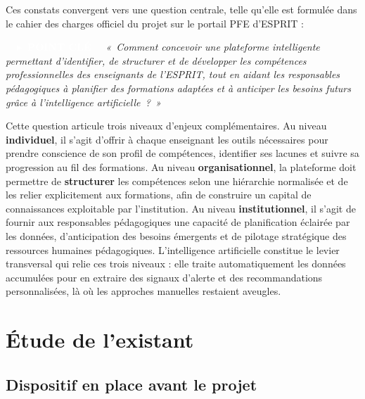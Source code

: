 \documentclass[12pt,a4paper]{report}
\newcommand{\keylabel}{\colorbox{keyborder}{\textcolor{white}{\bfseries\small~~$\blacktriangleright$~POINT CLÉ~~}}\;}
\begin{document}
Ces constats convergent vers une question centrale, telle qu'elle est formulée
dans le cahier des charges officiel du projet sur le portail PFE d'ESPRIT :

\begin{keyframe}
\keylabel{}
\textit{«~Comment concevoir une plateforme intelligente permettant d'identifier,
de structurer et de développer les compétences professionnelles des enseignants
de l'ESPRIT, tout en aidant les responsables pédagogiques à planifier des
formations adaptées et à anticiper les besoins futurs grâce à l'intelligence
artificielle~?~»}
\end{keyframe}

Cette question articule trois niveaux d'enjeux complémentaires. Au niveau
\textbf{individuel}, il s'agit d'offrir à chaque enseignant les outils
nécessaires pour prendre conscience de son profil de compétences, identifier
ses lacunes et suivre sa progression au fil des formations. Au niveau
\textbf{organisationnel}, la plateforme doit permettre de \textbf{structurer}
les compétences selon une hiérarchie normalisée et de les relier explicitement
aux formations, afin de construire un capital de connaissances exploitable par
l'institution. Au niveau \textbf{institutionnel}, il s'agit de fournir aux
responsables pédagogiques une capacité de planification éclairée par les
données, d'anticipation des besoins émergents et de pilotage stratégique des
ressources humaines pédagogiques. L'intelligence artificielle constitue le levier
transversal qui relie ces trois niveaux : elle traite automatiquement les données
accumulées pour en extraire des signaux d'alerte et des recommandations
personnalisées, là où les approches manuelles restaient aveugles.

\section{Étude de l'existant}

\subsection{Dispositif en place avant le projet}
\end{document}
